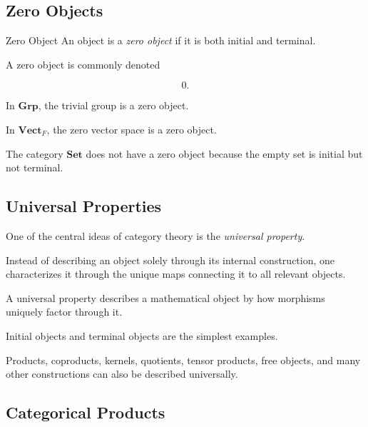 \subsection{Zero Objects}
\label{subsec:zero-objects}

\begin{definitionbox}{Zero Object}
An object is a \emph{zero object} if it is both initial and terminal.
\end{definitionbox}

A zero object is commonly denoted

\[ 0. \]

In \(\mathbf{Grp}\), the trivial group is a zero object.

In \(\mathbf{Vect}_F\), the zero vector space is a zero object.

The category \(\mathbf{Set}\) does not have a zero object because the empty
set is initial but not terminal.

\subsection{Universal Properties}
\label{subsec:universal-properties}

One of the central ideas of category theory is the \emph{universal
property}.

Instead of describing an object solely through its internal construction,
one characterizes it through the unique maps connecting it to all relevant
objects.

\begin{conceptbox}
A universal property describes a mathematical object by how morphisms
uniquely factor through it.
\end{conceptbox}

Initial objects and terminal objects are the simplest examples.

Products, coproducts, kernels, quotients, tensor products, free objects, and
many other constructions can also be described universally.

\subsection{Categorical Products}
\label{subsec:categorical-products}


